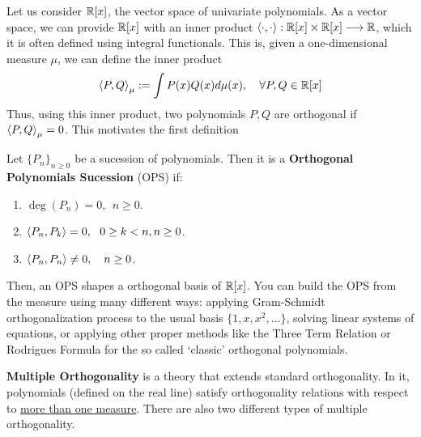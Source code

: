 \documentclass[portrait,final,a0paper,fontscale=0.38]{baposter}
\begin{document}
\begin{poster}
{\begin{multicols}{2}
  Let us consider $\mathbb{R}[x]$, the vector space of univariate polynomials. As a vector space, we can provide $\mathbb{R}[x]$ with an inner product $\left\langle \cdot , \cdot \right\rangle:\mathbb{R}[x]\times\mathbb{R}[x]\longrightarrow\mathbb{R}$, which it is often defined using integral functionals. This is, given a one-dimensional measure $\mu$, we can define the inner product
  $$
  \prodesc{P}{Q}_\mu:=\int P(x)Q(x)d\mu(x), \ \ \ \forall P,Q\in\R[x]
  $$
  Thus, using this inner product, two polynomials $P,Q$ are orthogonal if $\left\langle P , Q \right\rangle_\mu = 0$. This motivates the first definition
  \begin{definition}
    Let $\{P_n\}_{n\geq 0}$ be a sucession of polynomials. Then it is a \textbf{Orthogonal Polynomials Sucession} (OPS) if:
    \begin{enumerate}
      \item $\deg(P_n)=0, \ \ n\geq 0$.
      \item $\left\langle P_n , P_k \right\rangle=0, \ \ 0\geq k < n, n\geq 0$.
      \item $\prodesc{P_n}{P_n} \not = 0, \ \ \ n\geq 0$.
    \end{enumerate}
  \end{definition}
  Then, an OPS shapes a orthogonal basis of $\mathbb{R}[x]$. You can build the OPS from the measure using many different ways: applying Gram-Schmidt orthogonalization process to the usual basis $\{1,x,x^2,\dots\}$, solving linear systems of equations, or applying other proper methods like the Three Term Relation or Rodrigues Formula for the so called `classic' orthogonal polynomials. 


\end{multicols}
	}


  {

\begin{multicols}{2}

  \textbf{Multiple Orthogonality} is a theory that extends standard orthogonality. In it, polynomials (defined on the real line) satisfy orthogonality relations with respect to \underline{more than one measure}. There are also two different types of multiple orthogonality.


\end{multicols}}
\end{poster}
\end{document}
